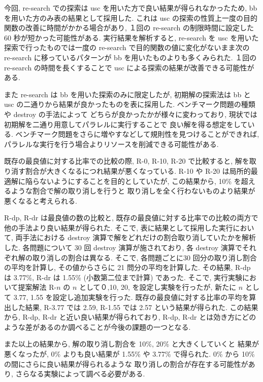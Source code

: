 今回, re-search での探索は usc を用いた方で良い結果が得られなかったため, 
bb を用いた方のみ表の結果として採用した. 
これは usc の探索の性質上一度の目的関数の改善に時間がかかる場合があり, 
１回の re-search の制限時間に設定した 60 秒が短かった可能性がある. 
実行結果を解析すると, re-search を usc を用いた探索で行ったものでは一度の re-search で目的関数の値に変化がないまま次の re-search に移っているパターンが 
bb を用いたものよりも多くみられた. 
１回の re-search の時間を長くすることで usc による探索の結果が改善できる可能性がある.

また re-search は bb を用いた探索のみに限定したが, 
初期解の探索法は bb と usc の二通りから結果が良かったものを表に採用した. 
ベンチマーク問題の種類や destroy の手法によって
どちらが良かったかが様々に変わっており, 
現状では初期解を二通り用意してパラレルに実行することで
良い解を得る想定をしている. 
ベンチマーク問題をさらに増やすなどして規則性を見つけることができれば, 
パラレルな実行を行う場合よりリソースを削減できる可能性がある.

既存の最良値に対する比率での比較の際, 
R-0, R-10, R-20 で比較すると, 
解を取り消す割合が大きくなるにつれ結果が悪くなっている.
R-10 や R-20 は局所的最適解に陥らないようにすることを目的としていたが, 
この結果から, 10\% を超えるような割合で解の取り消しを行うと
取り消しを全く行わないものより結果が悪くなると考えられる. 
 
R-dp, R-dr は最良値の数の比較と, 既存の最良値に対する比率での比較の両方で
他の手法より良い結果が得られた. 
そこで, 表に結果として採用した実行において, 
両手法における destroy 演算で解をどれだけの割合取り消していたかを解析した. 
各問題について 30 回 destroy 演算が施されており, 
各 destroy 演算でそれぞれ解の取り消しの割合は異なる. 
そこで, 各問題ごとに30 回分の取り消し割合の平均を計算し, 
その値からさらに 21 問分の平均を計算した. 
その結果, R-dp は 3.77\%, R-dr は 1.55\% (小数第二位まで計算) であった. 
そこで, 実行実験において提案解法 R-$n$ の $n$ として０,10, 20, を設定し実験を行ったが, 
新たに $n$ として 3.77, 1.55 を設定し追加実験を行った. 
既存の最良値に対する比率の平均を算出した結果, 
R-3.77 では 2.59, R-1.55 では 2.57 という結果が得られた.
この結果から, R-dp, R-dr と近い良い結果が得られており, 
R-dp, R-dr とは効き方にどのような差があるのか調べることが今後の課題の一つとなる. 

また以上の結果から, 
解の取り消し割合を 10\%, 20\% と大きくしていくと
結果が悪くなったが, 0\% よりも良い結果が 1.55\% や 3.77\% で得られた. 
0\% から 10\% の間にさらに良い結果が得られるような
取り消しの割合が存在する可能性があり, 
さらなる実験によって調べる必要がある. 


